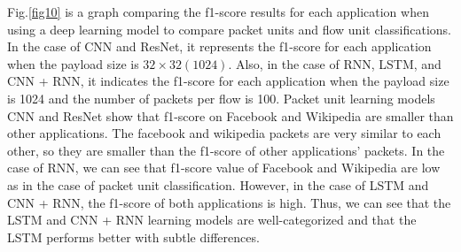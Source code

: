 Fig.\ref{fig10} is a graph comparing the f1-score results for each application when using a deep learning model to compare packet units and flow unit classifications.
In the case of CNN and ResNet, it represents the f1-score for each application when the payload size is $32 \times 32 (1024)$.
Also, in the case of RNN, LSTM, and CNN + RNN, it indicates the f1-score for each application when the payload size is 1024 and the number of packets per flow is 100.
Packet unit learning models CNN and ResNet show that f1-score on Facebook and Wikipedia are smaller than other applications.
The facebook and wikipedia packets are very similar to each other, so they are smaller than the f1-score of other applications' packets.
In the case of RNN, we can see that f1-score value of Facebook and Wikipedia are low as in the case of packet unit classification.
However, in the case of LSTM and CNN + RNN, the f1-score of both applications is high.
Thus, we can see that the LSTM and CNN + RNN learning models are well-categorized and that the LSTM performs better with subtle differences.